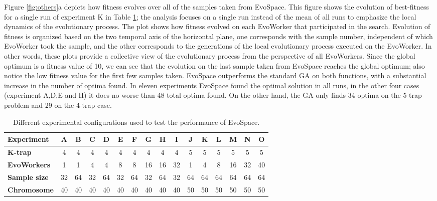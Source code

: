 Figure \ref{fig:others}a depicts how fitness evolves over all of the samples taken from EvoSpace.
This figure shows the evolution of best-fitness for a single run of experiment K in Table \ref{tab:exp};
the analysis focuses on a single run instead of the mean of all runs to emphasize the local dynamics of the evolutionary process.
The plot shows how fitness evolved on each EvoWorker that participated in the search.
Evolution of fitness is organized based on the two temporal axis of the horizontal plane,
one corresponds with the sample number, independent of which EvoWorker took the sample, and the other corresponds
to the generations of the local evolutionary process executed on the EvoWorker.
In other words, these plots provide a collective view of the evolutionary process from the perspective of all EvoWorkers.
Since the global optimum is a fitness value of 10, we can see that the evolution on the last sample taken from EvoSpace reaches the global optimum;
also notice the low fitness value for the first few samples taken.
EvoSpace outperforms the standard GA on both functions, with a substantial increase in the number of optima found.
In eleven experiments EvoSpace found the optimal solution in all runs, in the other four cases (experiment A,D,E and H) it does no worse than
48 total optima found.
On the other hand, the GA only finds 34 optima on the 5-trap problem and 29 on the 4-trap case.

\begin{table}[t]
\caption{Different experimental configurations used to test the
  performance of EvoSpace.} %
\centering
\scriptsize
\begin{tabular}{|l||c|c|c|c|c|c|c|c|c|c|c|c|c|c|c|}
   \hline
             \textbf{Experiment} 	& A & B & C & D & E & F & G & H & I & J & K & L & M & N & O \\

   \hline
               \textbf{K-trap}   	& 4  & 4  & 4  & 4  & 4  & 4  & 4  & 4  & 4 & 5 & 5 & 5 & 5 & 5 & 5 \\
			   \textbf{EvoWorkers}  & 1  & 1  & 4  & 4  & 8  & 8  & 16 & 16 & 32 & 1 & 4 & 8 & 16 & 32 & 40 \\
			   \textbf{Sample size} & 32 & 64 & 32 & 64 & 32 & 64 & 32 & 64 & 32 & 64 & 64 & 64 & 64 & 64 & 64 \\
			   \textbf{Chromosome} & 40 & 40 & 40 & 40 & 40 & 40 & 40 & 40 & 40 & 50 & 50 & 50 & 50 & 50 & 50 \\
   \hline
\end{tabular}
\label{tab:exp}
\end{table}


